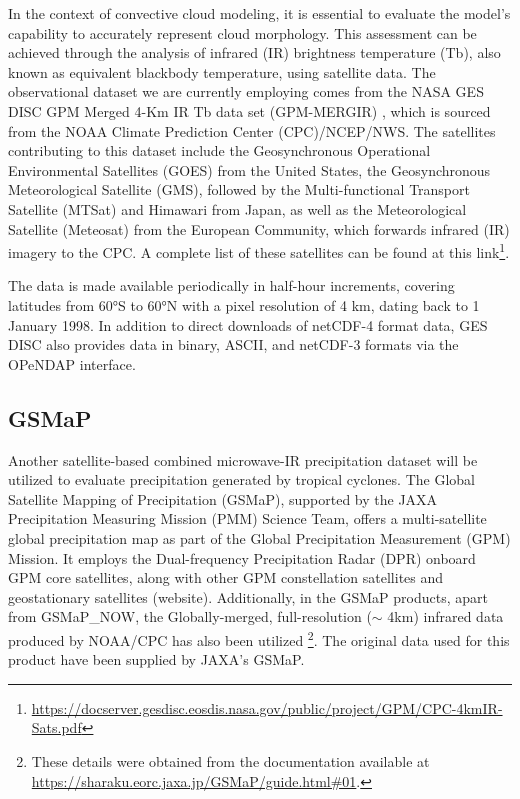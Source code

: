 In the context of convective cloud modeling, it is essential to evaluate the model's capability to accurately represent cloud morphology. This assessment can be achieved through the analysis of infrared (IR) brightness temperature (Tb), also known as equivalent blackbody temperature, using satellite data. The observational dataset we are currently employing comes from the NASA GES DISC GPM Merged 4-Km IR Tb data set (GPM-MERGIR) \cite{janowiak2017ncep}, which is sourced from the NOAA Climate Prediction Center (CPC)/NCEP/NWS. The satellites contributing to this dataset include the Geosynchronous Operational Environmental Satellites (GOES) from the United States, the Geosynchronous Meteorological Satellite (GMS), followed by the Multi-functional Transport Satellite (MTSat) and Himawari from Japan, as well as the Meteorological Satellite (Meteosat) from the European Community, which forwards infrared (IR) imagery to the CPC. A complete list of these satellites can be found at this link\footnote{\url{https://docserver.gesdisc.eosdis.nasa.gov/public/project/GPM/CPC-4kmIR-Sats.pdf}}.

The data is made available periodically in half-hour increments, covering latitudes from 60°S to 60°N with a pixel resolution of 4 km, dating back to 1 January 1998. In addition to direct downloads of netCDF-4 format data, GES DISC also provides data in binary, ASCII, and netCDF-3 formats via the OPeNDAP interface.

\subsection{GSMaP}
\label{section315}

Another satellite-based combined microwave-IR precipitation dataset will be utilized to evaluate precipitation generated by tropical cyclones. The Global Satellite Mapping of Precipitation (GSMaP), supported by the JAXA Precipitation Measuring Mission (PMM) Science Team, offers a multi-satellite global precipitation map as part of the Global Precipitation Measurement (GPM) Mission. It employs the Dual-frequency Precipitation Radar (DPR) onboard GPM core satellites, along with other GPM constellation satellites and geostationary satellites (website). Additionally, in the GSMaP products, apart from GSMaP\_NOW, the Globally-merged, full-resolution ($\sim$ 4km) infrared data produced by NOAA/CPC has also been utilized \footnote{These details were obtained from the documentation available at \url{https://sharaku.eorc.jaxa.jp/GSMaP/guide.html\#01}.}. The original data used for this product have been supplied by JAXA’s GSMaP.

